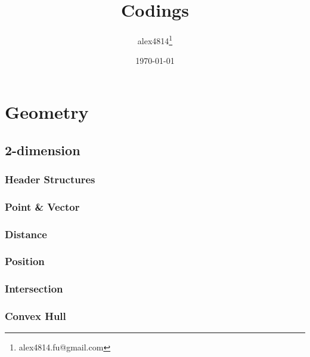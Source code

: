 \documentclass{article}
\begin{document}
\title{Codings}
\author{alex4814\footnote{alex4814.fu@gmail.com}}
\date{\today}
\maketitle

\tableofcontents



\section{Geometry}

\subsection{2-dimension}
\subsubsection{Header Structures}


\subsubsection{Point \& Vector}


\subsubsection{Distance}


\subsubsection{Position}


\subsubsection{Intersection}


\subsubsection{Convex Hull}

\end{document}
